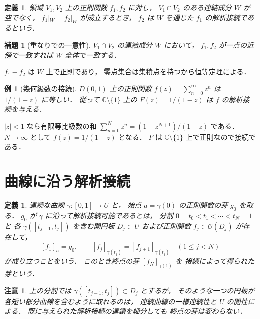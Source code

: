 \documentclass[a5paper,10pt,onecolumn]{jsarticle}
\makeatletter
\theoremstyle{mathnotetheorem}
\newtheorem{definition}[theorem]{定義}
\newtheorem{lemma}[theorem]{補題}
\newtheorem{example}[theorem]{例}
\newtheorem{remark}[theorem]{注意}
\renewcommand{\proofname}{証明}
\renewenvironment{proof}[1][\proofname]{%
  \par\pushQED{\qed}\normalfont\topsep4\p@\@plus2\p@\relax
  \trivlist\item[\hskip\labelsep\bfseries #1]\ignorespaces
}{\popQED\endtrivlist\@endpefalse}
\makeatother
\begin{document}
\begin{definition}
領域 $V_1,V_2$ 上の正則関数 $f_1,f_2$ に対し，
$V_1\cap V_2$ のある連結成分 $W$ が空でなく，
$f_1|_W=f_2|_W$ が成立するとき，
$f_2$ は $W$ を通じた $f_1$ の\emph{解析接続}であるという．
\end{definition}

\begin{lemma}[重なりでの一意性]\label{lem:overlap}
$V_1\cap V_2$ の連結成分 $W$ において，
$f_1,f_2$ が一点の近傍で一致すれば
$W$ 全体で一致する．
\end{lemma}
\begin{proof}
$f_1-f_2$ は $W$ 上で正則であり，
零点集合は集積点を持つから恒等定理による．
\end{proof}

\begin{example}[幾何級数の接続]
$D(0,1)$ 上の正則関数
$f(z)=\sum_{n=0}^\infty z^n$ は
$1/(1-z)$ に等しい．
従って $\mathbb C\setminus\{1\}$ 上の
$F(z)=1/(1-z)$ は $f$ の解析接続を与える．
\end{example}
\begin{proof}
$|z|<1$ なら有限等比級数の和
$\sum_{n=0}^Nz^n=(1-z^{N+1})/(1-z)$ である．
$N\to\infty$ として $f(z)=1/(1-z)$ となる．
$F$ は $\mathbb C\setminus\{1\}$ 上で正則なので接続である．
\end{proof}

\section{曲線に沿う解析接続}

\begin{definition}
連続な曲線 $\gamma:[0,1]\to U$ と，
始点 $a=\gamma(0)$ の正則関数の芽 $g_0$ を取る．
$g_0$ が $\gamma$ に沿って\emph{解析接続可能}であるとは，
分割
$0=t_0<t_1<\cdots<t_N=1$ と
各 $\gamma([t_{j-1},t_j])$ を含む開円板
$D_j\subset U$ および正則関数 $f_j\in\mathcal O(D_j)$ が存在して，
\[
 [f_1]_a=g_0,\qquad
 [f_j]_{\gamma(t_j)}=[f_{j+1}]_{\gamma(t_j)}
 \quad(1\le j<N)
\]
が成り立つことをいう．
このとき終点の芽 $[f_N]_{\gamma(1)}$ を
接続によって得られた芽という．
\end{definition}

\begin{remark}
上の分割では $\gamma([t_{j-1},t_j])\subset D_j$ とするが，
そのような一つの円板が各短い部分曲線を含むように取れるのは，
連続曲線の一様連続性と $U$ の開性による．
既に与えられた解析接続の連鎖を細分しても
終点の芽は変わらない．
\end{remark}
\end{document}
